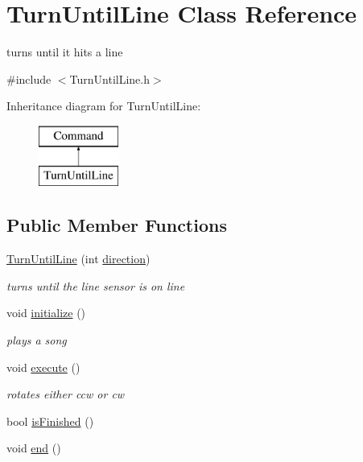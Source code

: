 \hypertarget{classTurnUntilLine}{\section{Turn\-Until\-Line Class Reference}
\label{classTurnUntilLine}
}


turns until it hits a line  




{\ttfamily \#include $<$Turn\-Until\-Line.\-h$>$}

Inheritance diagram for Turn\-Until\-Line\-:\begin{figure}[H]
\begin{center}
\leavevmode
\includegraphics[height=2.000000cm]{classTurnUntilLine}
\end{center}
\end{figure}
\subsection*{Public Member Functions}
\begin{DoxyCompactItemize}
\item 
\hyperlink{classTurnUntilLine_a737bfe72e0d4dbcce9f91182e319d28d}{Turn\-Until\-Line} (int \hyperlink{classTurnUntilLine_ac7e62d06dece2d456f9ea6e987b480cf}{direction})
\begin{DoxyCompactList}\small\item\em turns until the line sensor is on line \end{DoxyCompactList}\item 
void \hyperlink{classTurnUntilLine_a99e42f7512b95097df29633877e72cbd}{initialize} ()
\begin{DoxyCompactList}\small\item\em plays a song \end{DoxyCompactList}\item 
void \hyperlink{classTurnUntilLine_a90feb7840ebc51984e4d0a31383ec5a9}{execute} ()
\begin{DoxyCompactList}\small\item\em rotates either ccw or cw \end{DoxyCompactList}\item 
bool \hyperlink{classTurnUntilLine_ad9232508d735c78d6443958fe2f18002}{is\-Finished} ()
\item 
void \hyperlink{classTurnUntilLine_a769864873e706e0ca6701eac7f947ede}{end} ()
\end{DoxyCompactItemize}
